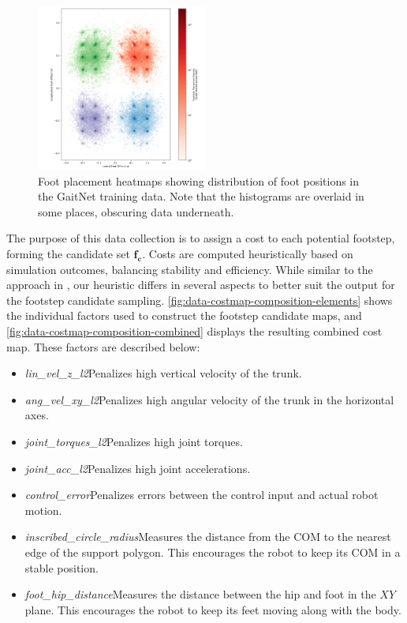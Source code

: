\begin{figure}[H]
  \centering
  \includegraphics[width=0.5\textwidth]{images/data/foot-placement-heatmaps.png}
  \caption{Foot placement heatmaps showing distribution of foot
    positions in the GaitNet training data. Note that the histograms
  are overlaid in some places, obscuring data underneath.}
  \label{fig:data-cn-training-distribution}
\end{figure}

The purpose of this data collection is to assign a cost to each
potential footstep, forming the candidate set $\mathbf{f_c}$. Costs
are computed heuristically based on simulation outcomes, balancing
stability and efficiency. While similar to the approach in
\cite{bratta_contactnet_2024}, our heuristic differs in several
aspects to better suit the output for the footstep candidate sampling.
\autoref{fig:data-costmap-composition-elements} shows the individual
factors used to construct the footstep candidate maps, and
\autoref{fig:data-costmap-composition-combined} displays the
resulting combined cost map. These factors are described below:

\begin{itemize}
  \item \textit{lin\_vel\_z\_l2}\textemdash Penalizes high vertical
    velocity of the trunk.
  \item \textit{ang\_vel\_xy\_l2}\textemdash Penalizes high angular
    velocity of the trunk in     the horizontal axes.
  \item \textit{joint\_torques\_l2}\textemdash Penalizes high joint torques.
  \item \textit{joint\_acc\_l2}\textemdash Penalizes high joint accelerations.
  \item \textit{control\_error}\textemdash Penalizes errors between the control
    input and actual robot motion.
  \item \textit{inscribed\_circle\_radius}\textemdash Measures the distance
    from the COM to the nearest edge of the support polygon. This
    encourages the robot to keep its COM in a stable position.
  \item \textit{foot\_hip\_distance}\textemdash Measures the distance
    between the hip and foot in the $XY$ plane. This encourages the
    robot to keep its feet moving along with the body.
\end{itemize}


